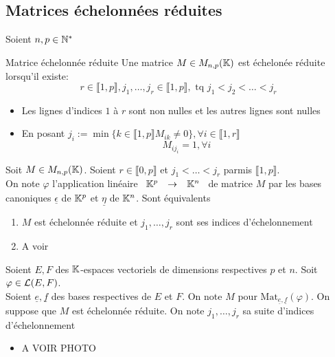 \documentclass[]{report}
\begin{document}
\subsection{Matrices échelonnées réduites}

Soient $n,p\in \mathbb{N}^*$

\begin{df}{Matrice échelonnée réduite}{}
    Une matrice $M\in M_{n,p}(\mathbb{K})$ est échelonée réduite lorsqu'il existe:
    \[r\in \llbracket1,p\rrbracket,j_1,\ldots,j_r\in\llbracket1,p\rrbracket,\text{ tq }j_1 < j_2 < \ldots <j_r\]
    \begin{itemize}
        \item Les lignes d'indices $1$ à $r$ sont non nulles et les autres lignes sont nulles
        \item En posant $j_i:= \min \{k\in \llbracket 1,p\rrbracket M_{ik}\neq 0\},\forall i\in \llbracket 1,r\rrbracket$
        \[M_{i j_i}=1,\forall i\]
    \end{itemize}
\end{df}

\begin{lm}{}{}
    Soit $M\in M_{n,p}(\mathbb{K})$. Soient $r\in \llbracket 0,p\rrbracket$ et $j_1<\ldots < j_r$ parmis $\llbracket 1,p\rrbracket$.\\
    On note $\varphi$ l'application linéaire $\begin{array}{ccccc} \mathbb{K}^p & \to & \mathbb{K}^n \end{array}$ de matrice $M$ par les bases canoniques $\underline{\epsilon}$ de $\mathbb{K}^p$ et $\underline{\eta}$ de $\mathbb{K}^n$. Sont équivalents
    \begin{enumerate}
        \item $M$ est échelonnée réduite et $j_1,\ldots,j_r$ sont ses indices d'échelonnement
        \item A voir
    \end{enumerate}
\end{lm}

\begin{prop}{}{}
    Soient $E,F$ des $\mathbb{K}$-espaces vectoriels de dimensions respectives $p$ et $n$. Soit $\varphi\in \mathcal{L}(E,F)$.\\
    Soient $\underline{e},\underline{f}$ des bases respectives de $E$ et $F$. On note $M$ pour $\text{Mat}_{\underline{e},\underline{f}}(\varphi)$. On suppose que $M$ est échelonnée réduite. On note $j_1,\ldots, j_r$ sa suite d'indices d'échelonnement
    \begin{itemize}
        \item A VOIR PHOTO
    \end{itemize}
\end{prop}
\end{document}
